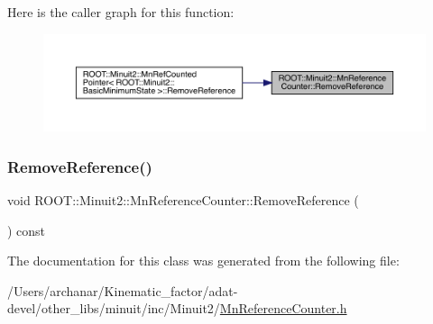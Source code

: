 Here is the caller graph for this function\+:
\nopagebreak
\begin{figure}[H]
\begin{center}
\leavevmode
\includegraphics[width=350pt]{dc/da2/classROOT_1_1Minuit2_1_1MnReferenceCounter_a243db2ef8fc1fab0a29ea1c83aececab_icgraph}
\end{center}
\end{figure}
\mbox{\label{classROOT_1_1Minuit2_1_1MnReferenceCounter_a243db2ef8fc1fab0a29ea1c83aececab}} 
\subsubsection{\texorpdfstring{RemoveReference()}{RemoveReference()}\hspace{0.1cm}{\footnotesize\ttfamily [3/3]}}
{\footnotesize\ttfamily void R\+O\+O\+T\+::\+Minuit2\+::\+Mn\+Reference\+Counter\+::\+Remove\+Reference (\begin{DoxyParamCaption}{ }\end{DoxyParamCaption}) const\hspace{0.3cm}{\ttfamily [inline]}}



The documentation for this class was generated from the following file\+:\begin{DoxyCompactItemize}
\item 
/\+Users/archanar/\+Kinematic\+\_\+factor/adat-\/devel/other\+\_\+libs/minuit/inc/\+Minuit2/\mbox{\hyperlink{adat-devel_2other__libs_2minuit_2inc_2Minuit2_2MnReferenceCounter_8h}{Mn\+Reference\+Counter.\+h}}\end{DoxyCompactItemize}
